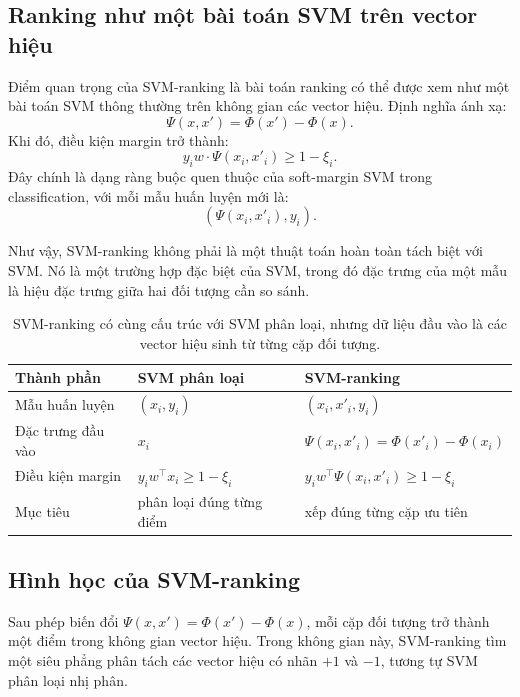 \subsection{Ranking như một bài toán SVM trên vector hiệu}

Điểm quan trọng của SVM-ranking là bài toán ranking có thể được xem như một bài toán SVM thông thường trên không gian các vector hiệu. Định nghĩa ánh xạ:
\begin{equation}
    \Psi(x,x')
    =
    \Phi(x')-\Phi(x).
    \label{eq:section4-pairwise-feature-map}
\end{equation}
Khi đó, điều kiện margin trở thành:
\[
    y_i
    w\cdot
    \Psi(x_i,x'_i)
    \geq
    1-\xi_i.
\]
Đây chính là dạng ràng buộc quen thuộc của soft-margin SVM trong classification, với mỗi mẫu huấn luyện mới là:
\[
    \left(
        \Psi(x_i,x'_i),
        y_i
    \right).
\]

Như vậy, SVM-ranking không phải là một thuật toán hoàn toàn tách biệt với SVM. Nó là một trường hợp đặc biệt của SVM, trong đó đặc trưng của một mẫu là hiệu đặc trưng giữa hai đối tượng cần so sánh.

\begin{table}[H]
    \centering
    \begin{tabular}{lll}
        \toprule
        \textbf{Thành phần} & \textbf{SVM phân loại} & \textbf{SVM-ranking} \\
        \midrule
        Mẫu huấn luyện & \((x_i,y_i)\) & \((x_i,x'_i,y_i)\) \\
        Đặc trưng đầu vào & \(x_i\) & \(\Psi(x_i,x'_i)=\Phi(x'_i)-\Phi(x_i)\) \\
        Điều kiện margin & \(y_i w^\top x_i\geq 1-\xi_i\) & \(y_i w^\top\Psi(x_i,x'_i)\geq 1-\xi_i\) \\
        Mục tiêu & phân loại đúng từng điểm & xếp đúng từng cặp ưu tiên \\
        \bottomrule
    \end{tabular}
    \caption{SVM-ranking có cùng cấu trúc với SVM phân loại, nhưng dữ liệu đầu vào là các vector hiệu sinh từ từng cặp đối tượng.}
    \label{tab:section4-svm-vs-ranking-svm}
\end{table}

\subsection{Hình học của SVM-ranking}

Sau phép biến đổi \(\Psi(x,x')=\Phi(x')-\Phi(x)\), mỗi cặp đối tượng trở thành một điểm trong không gian vector hiệu. Trong không gian này, SVM-ranking tìm một siêu phẳng phân tách các vector hiệu có nhãn \(+1\) và \(-1\), tương tự SVM phân loại nhị phân.

